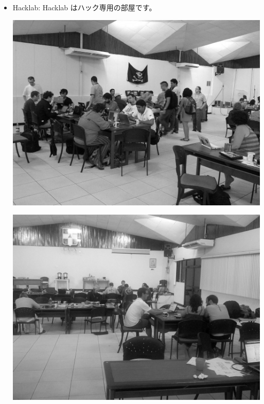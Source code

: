 \documentclass[mingoth,a4paper]{jsarticle}
\begin{document}
\begin{itemize}
  \item Hacklab: Hacklab はハック専用の部屋です。\\
	\begin{minipage}{0.4\hsize}
	\includegraphics[width=0.8\hsize]{image201208/debconf12_hacklab01_mono.jpg}
	\end{minipage}
        \begin{minipage}{0.4\hsize}
        \includegraphics[width=0.8\hsize]{image201208/debconf12_hacklab02_mono.jpg}
	\end{minipage}


\end{itemize}
\end{document}
